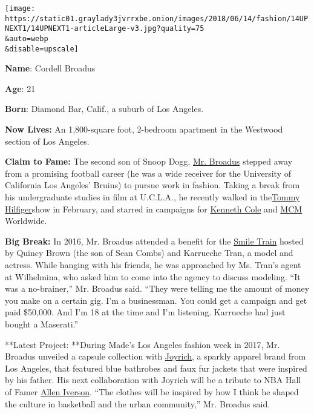 \texttt{[image: https://static01.graylady3jvrrxbe.onion/images/2018/06/14/fashion/14UPNEXT1/14UPNEXT1-articleLarge-v3.jpg?quality=75\\\&auto=webp\\\&disable=upscale]}

\textbf{Name}: Cordell Broadus

\textbf{Age}: 21

\textbf{Born}: Diamond Bar, Calif., a suburb of Los Angeles.

\textbf{Now Lives:} An 1,800-square foot, 2-bedroom apartment in the
Westwood section of Los Angeles.

\textbf{Claim to Fame:} The second son of Snoop Dogg,
\href{https://www.instagram.com/cbroadus}{Mr. Broadus} stepped away from
a promising football career (he was a wide receiver for the University
of California Los Angeles' Bruins) to pursue work in fashion. Taking a
break from his undergraduate studies in film at U.C.L.A., he recently
walked in
the\href{https://www.nytimes3xbfgragh.onion/2018/02/26/fashion/tommy-hilfiger-gigi-hadid-milan-fashion-week.html}{Tommy
Hilfiger}show in February, and starred in campaigns for
\href{https://www.kennethcole.com/campaign-tcc-spring-2018-cordell-broadus.html}{Kenneth
Cole} and \href{https://www.youtube.com/watch?v=kA8shaO9sYk}{MCM}
Worldwide.

\textbf{Big Break:} In 2016, Mr. Broadus attended a benefit for the
\href{https://www.smiletrain.org/}{Smile Train} hosted by Quincy Brown
(the son of Sean Combs) and Karrueche Tran, a model and actress. While
hanging with his friends, he was approached by Ms. Tran's agent at
Wilhelmina, who asked him to come into the agency to discuss modeling.
``It was a no-brainer,'' Mr. Broadus said. ``They were telling me the
amount of money you make on a certain gig. I'm a businessman. You could
get a campaign and get paid \$50,000. And I'm 18 at the time and I'm
listening. Karrueche had just bought a Maserati.''

**Latest Project: **During Made's Los Angeles fashion week in 2017, Mr.
Broadus unveiled a capsule collection with
\href{https://joyrich.com/}{Joyrich}, a sparkly apparel brand from Los
Angeles, that featured blue bathrobes and faux fur jackets that were
inspired by his father. His next collaboration with Joyrich will be a
tribute to NBA Hall of Famer
\href{https://www.nytimes3xbfgragh.onion/2016/04/05/sports/basketball/allen-iverson-hall-of-fame-shaquille-oneal-yao-ming-tom-izzo.html}{Allen
Iverson}. ``The clothes will be inspired by how I think he shaped the
culture in basketball and the urban community,'' Mr. Broadus said.

